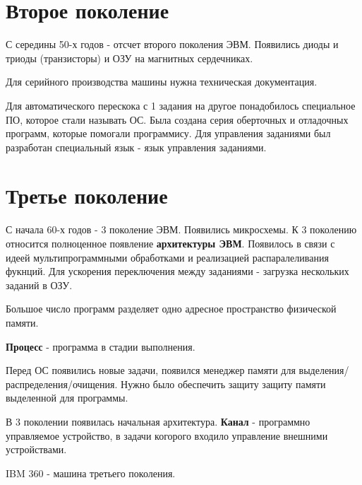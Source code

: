 \documentclass[a4paper, 14pt]{report}
\begin{document}
\section{Второе поколение}

С середины 50-х годов - отсчет второго поколения ЭВМ. Появились диоды и триоды (транзисторы) и ОЗУ на магнитных сердечниках.

Для серийного производства машины нужна техническая документация.


Для автоматического перескока с 1 задания на другое понадобилось специальное ПО, которое стали называть ОС. Была создана серия оберточных и отладочных программ, которые помогали программису. Для управления заданиями был разработан специальный язык - язык управления заданиями.

\section{Третье поколение}

С начала 60-х годов - 3 поколение ЭВМ. Появились микросхемы. К 3 поколению относится полноценное появление \textbf{архитектуры ЭВМ}. Появилось в связи с идеей мультипрограммными обработками и реализацией распаралеливания фукнций. Для ускорения переключения между заданиями - загрузка нескольких заданий в ОЗУ.

Большое число программ разделяет одно адресное пространство физической памяти.

\textbf{Процесс} - программа в стадии выполнения.

Перед ОС появились новые задачи, появился менеджер памяти для выделения/распределения/очищения. Нужно было обеспечить защиту защиту памяти выделенной для программы.

В 3 поколении появилась начальная архитектура. \textbf{Канал} - программно управляемое устройство, в задачи когорого входило управление внешними устройствами.

IBM 360 - машина третьего поколения.

\hfill

\end{document}
